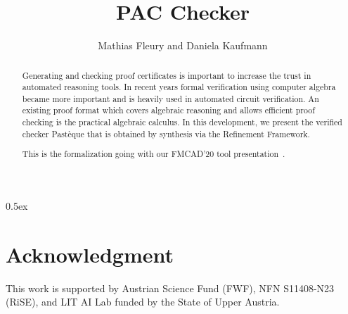 \documentclass[11pt,a4paper]{article}
\begin{document}
\title{PAC Checker}
\author{Mathias Fleury and Daniela Kaufmann}
\maketitle

\begin{abstract}
  Generating and checking proof certificates is important to
  increase the trust in automated reasoning tools. In recent years
  formal verification using computer algebra became more important and
  is heavily used in automated circuit verification.  An existing
  proof format which covers algebraic reasoning and allows efficient
  proof checking is the practical algebraic calculus. In this
  development, we present the verified checker Pastèque that is
  obtained by synthesis via the Refinement Framework.

  This is the formalization going with our FMCAD'20 tool presentation~\cite{KaufmannFleuryBiere-FMCAD20}.
\end{abstract}

\tableofcontents

\parindent 0pt\parskip 0.5ex




{\section*{Acknowledgment}
This work is supported by Austrian Science Fund (FWF), NFN S11408-N23
(RiSE), and LIT AI Lab funded by the State of Upper Austria.
}



\end{document}
